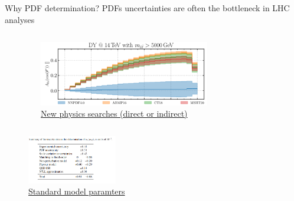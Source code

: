 \documentclass[8pt,t]{beamer}
\begin{document}
\begin{frame}{Why PDF determination?}
  PDFs uncertainties are often the bottleneck in LHC analyses
  \begin{columns}
    \begin{column}{0.5\textwidth}
      \end{column}
    \begin{column}{0.5\textwidth}
      \begin{figure}
        \includegraphics[width=0.7\textwidth]{nnpdf_fba.png}
        \caption*{\hyperlink{https://arxiv.org/pdf/2209.08115}{
          New physics searches (direct or indirect) \\
          \color{gray}{\footnotesize [CMS Collaboration, 2209.08115]}}
        }
      \end{figure}
    \end{column}
  \end{columns}
  \begin{figure}
    \includegraphics[width=0.35\textwidth]{alphas_table_atlas.png}
    \caption*{\hyperlink{https://arxiv.org/pdf/2309.12986}{
      Standard model paramters \\
      \color{gray}{\footnotesize [ATLAS Collaboration, 2309.12986]}}
    }
  \end{figure}
\end{frame}
\end{document}

